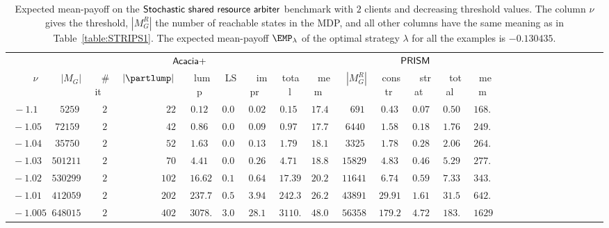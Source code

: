 \begin{table}[h!]
	\caption{Expected mean-payoff on the $\sf{Stochastic\ shared\ resource\ arbiter}$ benchmark with $2$ clients and decreasing threshold values. The column $\nu$ gives the threshold, $|M_G^R|$ the number of reachable states in the MDP, and all other columns have the same meaning as in Table~\ref{table:STRIPS1}. The expected mean-payoff $\EMP_\lambda$ of the optimal strategy $\lambda$ for all the examples is $-0.130435$.}	\label{table:LTL}
	\centering
	\scriptsize
 	\begin{tabular}{|r||r|r|r|r|r|r|r|r||r|r|r|r|r|r|r|r|r|r|r|r|r|r|r|r|}
		\hline
	  	& \multicolumn{8}{|c||}{{\small $\sf{Acacia+}$}} & \multicolumn{5}{|c|}{{\small $\sf{PRISM}$}}\rule[-2pt]{0pt}{10pt}\\
		$\nu~$ & $|M_G|$  & \ $\#$it \  & $\ |\partlump|\ $ & \ lump  \ &  \ LS \  &  \ impr  \ & \  total \  & \ mem \ & $|M_G^R| $ & \ constr \  & \ strat \  & \ total \ & \ mem\ \rule[-3pt]{0pt}{10pt}\\
\hline $\ -1.1\ $ & $\ 5259\ $ & $\ 2\ $ & $\ 22\ $ & $\ 0.12\ $ & $\ 0.01\ $ & $\ 0.02\ $  & $\ 0.15\ $ & $\ 17.4\ $ & $\ 691\ $ & $\ 0.43\ $ & $\ 0.07\ $  & $\ 0.50\ $ & $\ 168.1\ $\rule[-3pt]{0pt}{10pt}\\
$\ -1.05\ $ & $\ 72159\ $ & $\ 2\ $ & $\ 42\ $ & $\ 0.86\ $ & $\ 0.01\ $ & $\ 0.09\ $  & $\ 0.97\ $ & $\ 17.7\ $ & $\ 6440\ $ & $\ 1.58\ $ & $\ 0.18\ $  & $\ 1.76\ $ & $\ 249.9\ $\rule[-3pt]{0pt}{10pt}\\
$\ -1.04\ $ & $\ 35750\ $ & $\ 2\ $ & $\ 52\ $ & $\ 1.63\ $ & $\ 0.02\ $ & $\ 0.13\ $  & $\ 1.79\ $ & $\ 18.1\ $ & $\ 3325\ $ & $\ 1.78\ $ & $\ 0.28\ $  & $\ 2.06\ $ & $\ 264.1\ $\rule[-3pt]{0pt}{10pt}\\
$\ -1.03\ $ & $\ 501211\ $ & $\ 2\ $ & $\ 70\ $ & $\ 4.41\ $ & $\ 0.04\ $ & $\ 0.26\ $  & $\ 4.71\ $ & $\ 18.8\ $ & $\ 15829\ $ & $\ 4.83\ $ & $\ 0.46\ $  & $\ 5.29\ $ & $\ 277.0\ $\rule[-3pt]{0pt}{10pt}\\
$\ -1.02\ $ & $\ 530299\ $ & $\ 2\ $ & $\ 102\ $ & $\ 16.62\ $ & $\ 0.11\ $ & $\ 0.64\ $  & $\ 17.39\ $ & $\ 20.2\ $ & $\ 11641\ $ & $\ 6.74\ $ & $\ 0.59\ $  & $\ 7.33\ $ & $\ 343.4\ $\rule[-3pt]{0pt}{10pt}\\
$\ -1.01\ $ & $\ 4120599\ $ & $\ 2\ $ & $\ 202\ $ & $\ 237.78\ $ & $\ 0.50\ $ & $\ 3.94\ $  & $\ 242.30\ $ & $\ 26.2\ $ & $\ 43891\ $ & $\ 29.91\ $ & $\ 1.61\ $  & $\ 31.52\ $ & $\ 642.5\ $\rule[-3pt]{0pt}{10pt}\\
$\ -1.005\ $ & $\ 64801599\ $ & $\ 2\ $ & $\ 402\ $ & $\ 3078.88\ $ & $\ 3.07\ $ & $\ 28.19\ $  & $\ 3110.50\ $ & $\ 48.0\ $ & $\ 563585\ $ & $\ 179.23\ $ & $\ 4.72\ $  & $\ 183.95\ $ & $\ 1629.2\ $\rule[-3pt]{0pt}{10pt}\\

\end{tabular}
\end{table}

